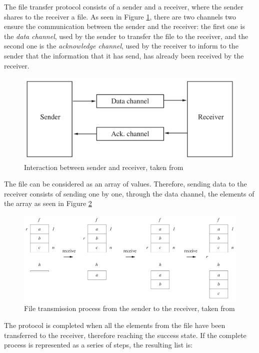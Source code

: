 The file transfer protocol consists of a sender and a receiver, where the sender shares to the receiver a file. As seen in Figure \ref{fig:cs5}, there are two channels two ensure the communication between the sender and the receiver: the first one is the \textit{data channel}, used by the sender to transfer the file to the receiver, and the second one is the \textit{acknowledge channel}, used by the receiver to inform to the sender that the information that it has send, has already been received by the receiver.
\begin{figure}[H]
    \centering
    \includegraphics[scale = 0.2]{images/CS5.png}
    \caption{Interaction between sender and receiver, taken from \cite{Abrial2011}}
    \label{fig:cs5}
\end{figure}
The file can be considered as an array of values. Therefore, sending data to the receiver consists of sending one by one, through the data channel, the elements of the array as seen in Figure \ref{fig:cs6}  
\begin{figure}[H]
    \centering
    \includegraphics[scale = 0.3]{images/CS6.png}
    \caption{File transmission process from the sender to the receiver, taken from \cite{Abrial2011}}
    \label{fig:cs6}
\end{figure}
The protocol is completed when all the elements from the file have been transferred to the receiver, therefore reaching the success state. If the complete process is represented as a series of steps, the resulting list is:
